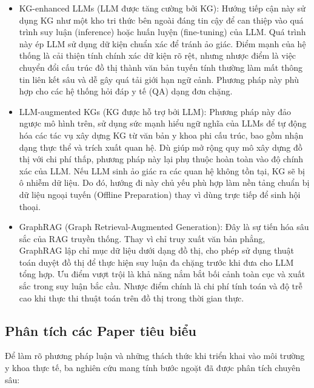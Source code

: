 \documentclass[conference]{IEEEtran}
\begin{document}
\begin{itemize}
    \item KG-enhanced LLMs (LLM được tăng cường bởi KG): Hướng tiếp cận này sử dụng KG như một kho tri thức bên ngoài đáng tin cậy để can thiệp vào quá trình suy luận (inference) hoặc huấn luyện (fine-tuning) của LLM. Quá trình này ép LLM sử dụng dữ kiện chuẩn xác để tránh ảo giác. Điểm mạnh của hệ thống là cải thiện tính chính xác dữ kiện rõ rệt, nhưng nhược điểm là việc chuyển đổi cấu trúc đồ thị thành văn bản tuyến tính thường làm mất thông tin liên kết sâu và dễ gây quá tải giới hạn ngữ cảnh. Phương pháp này phù hợp cho các hệ thống hỏi đáp y tế (QA) dạng đơn chặng.
    \item LLM-augmented KGs (KG được hỗ trợ bởi LLM): Phương pháp này đảo ngược mô hình trên, sử dụng sức mạnh hiểu ngữ nghĩa của LLMs để tự động hóa các tác vụ xây dựng KG từ văn bản y khoa phi cấu trúc, bao gồm nhận dạng thực thể và trích xuất quan hệ. Dù giúp mở rộng quy mô xây dựng đồ thị với chi phí thấp, phương pháp này lại phụ thuộc hoàn toàn vào độ chính xác của LLM. Nếu LLM sinh ảo giác ra các quan hệ không tồn tại, KG sẽ bị ô nhiễm dữ liệu. Do đó, hướng đi này chủ yếu phù hợp làm nền tảng chuẩn bị dữ liệu ngoại tuyến (Offline Preparation) thay vì dùng trực tiếp để sinh hội thoại.
    \item GraphRAG (Graph Retrieval-Augmented Generation): Đây là sự tiến hóa sâu sắc của RAG truyền thống. Thay vì chỉ truy xuất văn bản phẳng, GraphRAG lập chỉ mục dữ liệu dưới dạng đồ thị, cho phép sử dụng thuật toán duyệt đồ thị để thực hiện suy luận đa chặng trước khi đưa cho LLM tổng hợp. Ưu điểm vượt trội là khả năng nắm bắt bối cảnh toàn cục và xuất sắc trong suy luận bắc cầu. Nhược điểm chính là chi phí tính toán và độ trễ cao khi thực thi thuật toán trên đồ thị trong thời gian thực.
\end{itemize}


\subsection{Phân tích các Paper tiêu biểu}

Để làm rõ phương pháp luận và những thách thức khi triển khai vào môi trường y khoa thực tế, ba nghiên cứu mang tính bước ngoặt đã được phân tích chuyên sâu:
\end{document}
